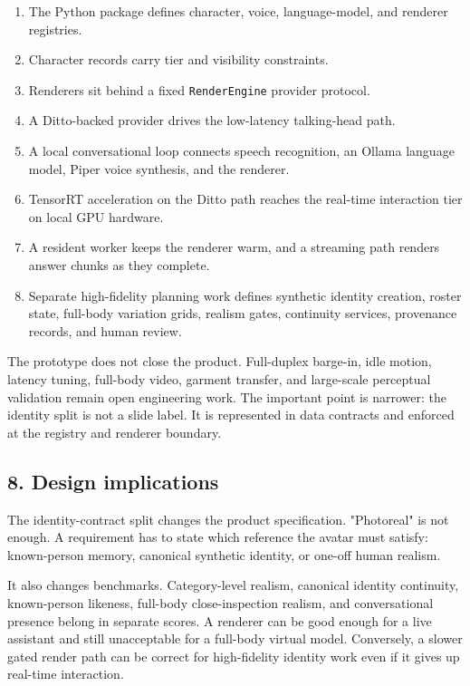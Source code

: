 \documentclass[
]{article}
\providecommand{\tightlist}{%
  \setlength{\itemsep}{0pt}\setlength{\parskip}{0pt}}
\begin{document}
\begin{enumerate}
\def\labelenumi{\arabic{enumi}.}
\tightlist
\item
  The Python package defines character, voice, language-model, and
  renderer registries.
\item
  Character records carry tier and visibility constraints.
\item
  Renderers sit behind a fixed \texttt{RenderEngine} provider protocol.
\item
  A Ditto-backed provider drives the low-latency talking-head path.
\item
  A local conversational loop connects speech recognition, an Ollama
  language model, Piper voice synthesis, and the renderer.
\item
  TensorRT acceleration on the Ditto path reaches the real-time
  interaction tier on local GPU hardware.
\item
  A resident worker keeps the renderer warm, and a streaming path
  renders answer chunks as they complete.
\item
  Separate high-fidelity planning work defines synthetic identity
  creation, roster state, full-body variation grids, realism gates,
  continuity services, provenance records, and human review.
\end{enumerate}

The prototype does not close the product. Full-duplex barge-in, idle
motion, latency tuning, full-body video, garment transfer, and
large-scale perceptual validation remain open engineering work. The
important point is narrower: the identity split is not a slide label. It
is represented in data contracts and enforced at the registry and
renderer boundary.

\subsection{8. Design implications}\label{8-design-implications}

The identity-contract split changes the product specification.
"Photoreal" is not enough. A requirement has to state which reference
the avatar must satisfy: known-person memory, canonical synthetic
identity, or one-off human realism.

It also changes benchmarks. Category-level realism, canonical identity
continuity, known-person likeness, full-body close-inspection realism,
and conversational presence belong in separate scores. A renderer can be
good enough for a live assistant and still unacceptable for a full-body
virtual model. Conversely, a slower gated render path can be correct for
high-fidelity identity work even if it gives up real-time interaction.
\end{document}
